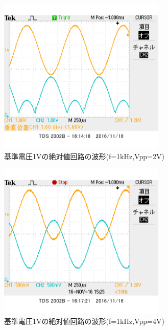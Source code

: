\documentclass[11pt,a4j]{jsarticle}
\begin{document}
  \begin{figure}[htbp]
  \centering
  \includegraphics[width=8cm,clip]{2_abs_Vr1_f1V2sin_ViVo.png}
  \caption{基準電圧1Vの絶対値回路の波形(f=1kHz,Vpp=2V)}
  \label{fig:2_Vr1_2}
 \end{figure}%
  
  
  \begin{figure}[htbp]
  \centering
  \includegraphics[width=8cm,clip]{2_abs_Vr1_f1V4sin_ViVo.png}
  \caption{基準電圧1Vの絶対値回路の波形(f=1kHz,Vpp=4V)}
  \label{fig:2_Vr1_4}
 \end{figure}%
  
  
  \clearpage
  
\end{document}
